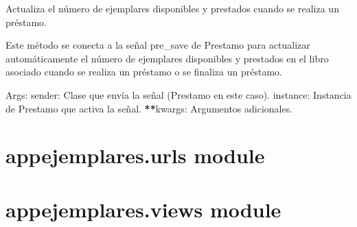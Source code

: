 \documentclass[letterpaper,10pt,spanish]{sphinxmanual}
\begin{document}

\begin{fulllineitems}
\label{\detokenize{modules/appejemplares:appejemplares.models.actualizar_ejemplares_libro}}
\pysigstartsignatures
{}
\pysigstopsignatures
\sphinxAtStartPar
Actualiza el número de ejemplares disponibles y prestados cuando se realiza un préstamo.

\sphinxAtStartPar
Este método se conecta a la señal pre\_save de Prestamo para actualizar automáticamente
el número de ejemplares disponibles y prestados en el libro asociado cuando se realiza
un préstamo o se finaliza un préstamo.

\sphinxAtStartPar
Args:
\sphinxhyphen{} sender: Clase que envía la señal (Prestamo en este caso).
\sphinxhyphen{} instance: Instancia de Prestamo que activa la señal.
\sphinxhyphen{} {\color{red}\bfseries{}**}kwargs: Argumentos adicionales.

\end{fulllineitems}



\section{appejemplares.urls module}
\label{\detokenize{modules/appejemplares:module-appejemplares.urls}}\label{\detokenize{modules/appejemplares:appejemplares-urls-module}}

\section{appejemplares.views module}
\label{\detokenize{modules/appejemplares:module-appejemplares.views}}\label{\detokenize{modules/appejemplares:appejemplares-views-module}}
\end{document}
